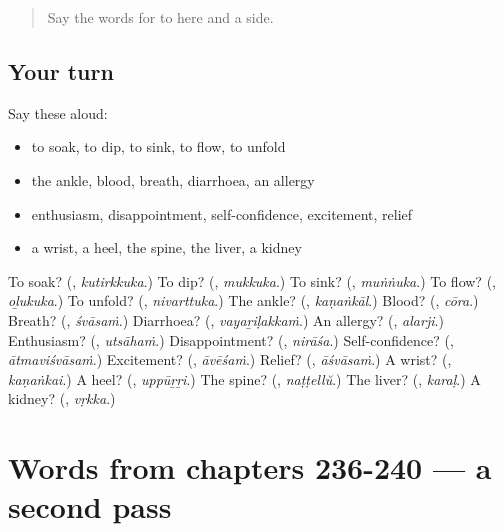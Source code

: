 \label{lesson:ML-R240-first-pass-words-from-chapters-232-235}



\begin{quote}
Say the words for to here and a side.
\end{quote}

\subsection*{Your turn}
Say these aloud:

\begin{itemize}
\raggedright
  \item to soak, to dip, to sink, to flow, to unfold
  \item the ankle, blood, breath, diarrhoea, an allergy
  \item enthusiasm, disappointment, self-confidence, excitement, relief
  \item a wrist, a heel, the spine, the liver, a kidney
\end{itemize}

\begin{tcolorbox}[breakable,colback=teal!4,colframe=teal!35!black,title={Before you move on}]
To soak? (\textbf{}, \emph{kutirkkuka}.) To dip? (\textbf{}, \emph{mukkuka}.) To sink? (\textbf{}, \emph{muṅṅuka}.) To flow? (\textbf{}, \emph{oḻukuka}.) To unfold? (\textbf{}, \emph{nivarttuka}.) The ankle? (\textbf{}, \emph{kaṇaṅkāl}.) Blood? (\textbf{}, \emph{cōra}.) Breath? (\textbf{}, \emph{śvāsaṁ}.) Diarrhoea? (\textbf{}, \emph{vayaṟiḷakkaṁ}.) An allergy? (\textbf{}, \emph{alarji}.) Enthusiasm? (\textbf{}, \emph{utsāhaṁ}.) Disappointment? (\textbf{}, \emph{nirāśa}.) Self-confidence? (\textbf{}, \emph{ātmaviśvāsaṁ}.) Excitement? (\textbf{}, \emph{āvēśaṁ}.) Relief? (\textbf{}, \emph{āśvāsaṁ}.) A wrist? (\textbf{}, \emph{kaṇaṅkai}.) A heel? (\textbf{}, \emph{uppūṟṟi}.) The spine? (\textbf{}, \emph{naṭṭellŭ}.) The liver? (\textbf{}, \emph{karaḷ}.) A kidney? (\textbf{}, \emph{vṛkka}.)
\end{tcolorbox}
\section[(dialogue)]{Words from chapters 236-240 — a second pass}

